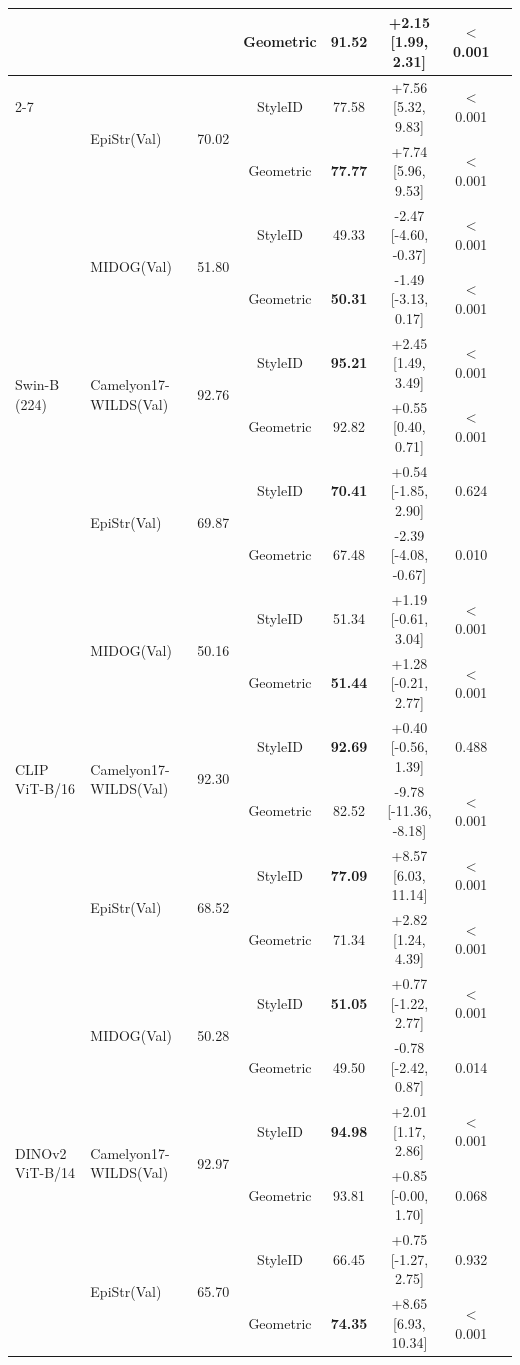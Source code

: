 \begin{table}[htbp]
{\begin{tabular}{llcccccc}
 &  &  & Geometric & 91.52 & +2.15 [1.99, 2.31] & $<$0.001 \\
\cmidrule{2-7}
 & \multirow{2}{*}{EpiStr(Val)} & \multirow{2}{*}{70.02} & StyleID & 77.58 & +7.56 [5.32, 9.83] & $<$0.001 \\
 &  &  & Geometric & \textbf{77.77} & +7.74 [5.96, 9.53] & $<$0.001 \\
\midrule
\multirow{6}{*}{Swin-B (224)} & \multirow{2}{*}{MIDOG(Val)} & \multirow{2}{*}{51.80} & StyleID & 49.33 & -2.47 [-4.60, -0.37] & $<$0.001 \\
 &  &  & Geometric & \textbf{50.31} & -1.49 [-3.13, 0.17] & $<$0.001 \\
\cmidrule{2-7}
 & \multirow{2}{*}{Camelyon17-WILDS(Val)} & \multirow{2}{*}{92.76} & StyleID & \textbf{95.21} & +2.45 [1.49, 3.49] & $<$0.001 \\
 &  &  & Geometric & 92.82 & +0.55 [0.40, 0.71] & $<$0.001 \\
\cmidrule{2-7}
 & \multirow{2}{*}{EpiStr(Val)} & \multirow{2}{*}{69.87} & StyleID & \textbf{70.41} & +0.54 [-1.85, 2.90] & 0.624 \\
 &  &  & Geometric & 67.48 & -2.39 [-4.08, -0.67] & 0.010 \\
\midrule
\multirow{6}{*}{CLIP ViT-B/16} & \multirow{2}{*}{MIDOG(Val)} & \multirow{2}{*}{50.16} & StyleID & 51.34 & +1.19 [-0.61, 3.04] & $<$0.001 \\
 &  &  & Geometric & \textbf{51.44} & +1.28 [-0.21, 2.77] & $<$0.001 \\
\cmidrule{2-7}
 & \multirow{2}{*}{Camelyon17-WILDS(Val)} & \multirow{2}{*}{92.30} & StyleID & \textbf{92.69} & +0.40 [-0.56, 1.39] & 0.488 \\
 &  &  & Geometric & 82.52 & -9.78 [-11.36, -8.18] & $<$0.001 \\
\cmidrule{2-7}
 & \multirow{2}{*}{EpiStr(Val)} & \multirow{2}{*}{68.52} & StyleID & \textbf{77.09} & +8.57 [6.03, 11.14] & $<$0.001 \\
 &  &  & Geometric & 71.34 & +2.82 [1.24, 4.39] & $<$0.001 \\
\midrule
\multirow{6}{*}{DINOv2 ViT-B/14} & \multirow{2}{*}{MIDOG(Val)} & \multirow{2}{*}{50.28} & StyleID & \textbf{51.05} & +0.77 [-1.22, 2.77] & $<$0.001 \\
 &  &  & Geometric & 49.50 & -0.78 [-2.42, 0.87] & 0.014 \\
\cmidrule{2-7}
 & \multirow{2}{*}{Camelyon17-WILDS(Val)} & \multirow{2}{*}{92.97} & StyleID & \textbf{94.98} & +2.01 [1.17, 2.86] & $<$0.001 \\
 &  &  & Geometric & 93.81 & +0.85 [-0.00, 1.70] & 0.068 \\
\cmidrule{2-7}
 & \multirow{2}{*}{EpiStr(Val)} & \multirow{2}{*}{65.70} & StyleID & 66.45 & +0.75 [-1.27, 2.75] & 0.932 \\
 &  &  & Geometric & \textbf{74.35} & +8.65 [6.93, 10.34] & $<$0.001 \\
\bottomrule
\end{tabular}%
}
\end{table}
